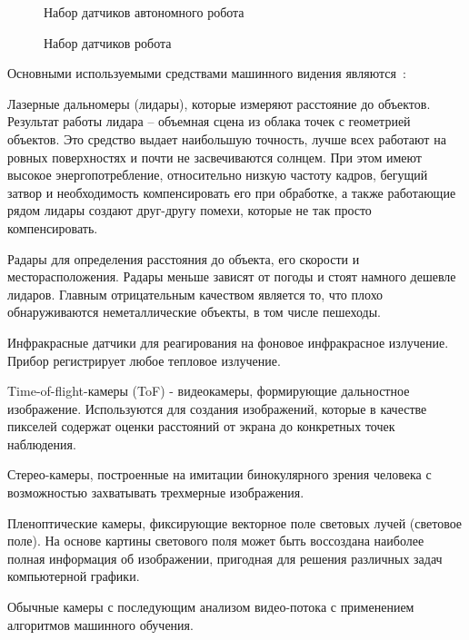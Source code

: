 \begin{figure}[ht]
    \caption{Набор датчиков автономного робота}\label{fig:robot1}
\end{figure}

\begin{figure}[ht]
    \caption{Набор датчиков робота}\label{fig:robot2}
\end{figure}

Основными используемыми средствами машинного видения являются~\cite{confbib1}:

Лазерные дальномеры (лидары), которые измеряют расстояние до объектов. Результат работы лидара – объемная сцена из облака точек с геометрией объектов. Это средство выдает наибольшую точность, лучше всех работают на ровных поверхностях и почти не засвечиваются солнцем. При этом имеют высокое энергопотребление, относительно низкую частоту кадров, бегущий затвор и необходимость компенсировать его при обработке, а также работающие рядом лидары создают друг-другу помехи, которые не так просто компенсировать.

Радары для определения расстояния до объекта, его скорости и месторасположения. Радары меньше зависят от погоды и стоят намного дешевле лидаров. Главным отрицательным качеством является то, что плохо обнаруживаются неметаллические объекты, в том числе пешеходы.

Инфракрасные датчики для реагирования на фоновое инфракрасное излучение. Прибор регистрирует любое тепловое излучение.

Time-of-flight-камеры (ToF) - видеокамеры, формирующие дальностное изображение. Используются для создания изображений, которые в качестве пикселей содержат оценки расстояний от экрана до конкретных точек наблюдения.

Стерео-камеры, построенные на имитации бинокулярного зрения человека с возможностью захватывать трехмерные изображения.

Пленоптические камеры, фиксирующие векторное поле световых лучей (световое поле). На основе картины светового поля может быть воссоздана наиболее полная информация об изображении, пригодная для решения различных задач компьютерной графики.

Обычные камеры с последующим анализом видео-потока с применением алгоритмов машинного обучения.

